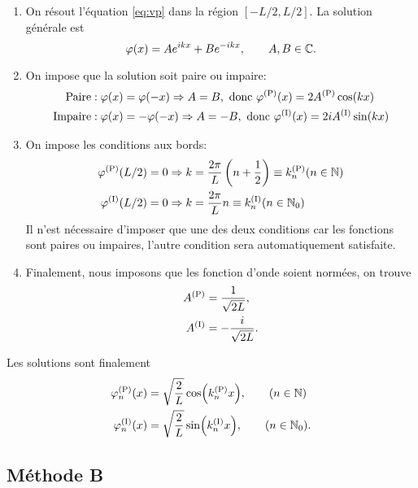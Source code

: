 \documentclass[11pt,a4paper,oneside]{article}
\begin{document}
\begin{enumerate}
    \item On résout l'équation \eqref{eq:vp} dans la région $[-L/2,L/2]$. La solution générale est
    \begin{equation}
        \varphi(x)=Ae^{ikx}+Be^{-ikx},\qquad A,B\in\mathbb{C}.
    \end{equation}
    \item On impose que la solution soit paire ou impaire:
    \begin{align}
        \text{Paire} &: \varphi(x)=\varphi(-x) \Rightarrow A=B,\text{ donc } \varphi^{(\text{P})}(x) = 2A^{(\text{P})}\cos(kx)\\
        \text{Impaire} &: \varphi(x)=-\varphi(-x) \Rightarrow A=-B,\text{ donc } \varphi^{(\text{I})}(x) = 2iA^{(\text{I})}\sin(kx)
    \end{align}
    \item On impose les conditions aux bords:
    \begin{align}
        \varphi^{(\text{P})}(L/2)&=0 \Rightarrow k=\frac{2\pi}{L}\left( n+\frac{1}{2} \right)\equiv k^{(\text{P})}_n (n\in\mathbb{N})\\
        \varphi^{(\text{I})}(L/2)&=0 \Rightarrow k=\frac{2\pi}{L}n\equiv k^{(\text{I})}_n (n\in\mathbb{N}_0)
    \end{align}
    Il n'est nécessaire d'imposer que une des deux conditions car les fonctions sont paires ou impaires, l'autre condition sera automatiquement satisfaite.
    \item Finalement, nous imposons que les fonction d'onde soient normées, on trouve
    \begin{align}
        A^{(\text{P})} &= \frac{1}{\sqrt{2L}},\\
        A^{(\text{I})} &= -\frac{i}{\sqrt{2L}}.
    \end{align}
\end{enumerate}
Les solutions sont finalement
\begin{align}
    \varphi_n^{(\text{P})}(x) &= \sqrt{\frac{2}{L}}\cos(k^{(\text{P})}_nx),\qquad (n\in\mathbb{N})\label{eq:solf1}\\
    \varphi_n^{(\text{I})}(x) &= \sqrt{\frac{2}{L}}\sin(k^{(\text{I})}_nx),\qquad (n\in\mathbb{N}_0).\label{eq:solf2}
\end{align}

\subsection{Méthode B}
\end{document}
